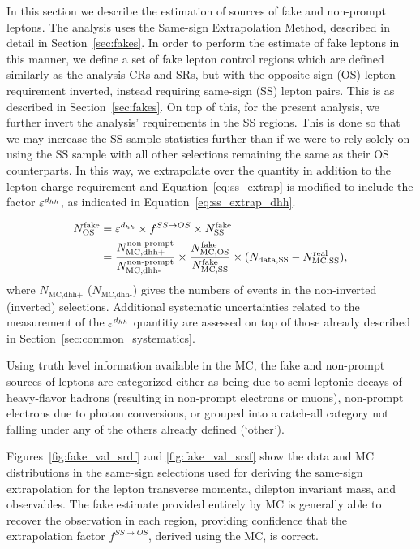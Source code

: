 In this section we describe the estimation of sources of fake and non-prompt leptons.
The analysis uses the Same-sign Extrapolation Method, described in detail in Section~\ref{sec:fakes}.
In order to perform the estimate of fake leptons in this manner, we define a set of fake lepton control
regions which are defined similarly as the analysis CRs and SRs, but with the opposite-sign (OS)
lepton requirement inverted, instead requiring same-sign (SS) lepton pairs.
This is as described in Section~\ref{sec:fakes}.
On top of this, for the present analysis, we further invert the analysis' \dhh requirements in the SS
regions.
This is done so that we may increase the SS sample statistics further than if we were to rely solely
on using the SS sample with all other selections remaining the same as their OS counterparts.
In this way, we extrapolate over the \dhh quantity in addition to the lepton charge requirement
and Equation~\ref{eq:ss_extrap} is modified to include the factor $\varepsilon^{ d_{hh}}$, as indicated in Equation~\ref{eq:ss_extrap_dhh}.

\begin{align}
    N_{\text{OS}}^{\text{fake}} &= \varepsilon^{ d_{hh}} \times f^{SS \rightarrow OS} \times N_{\text{SS}}^{\text{fake}} \nonumber \\
        &= \frac{N_{\text{MC,dhh+}}^{\text{non-prompt}}}{N_{\text{MC,dhh-}}^{\text{non-prompt}}} \times  \frac{ N_{\text{MC,OS}}^{\text{fake}} }{ N_{\text{MC,SS}}^{\text{fake}} } \times ( N_{\text{data,SS}} - N_{\text{MC,SS}}^{\text{real}} ),
        \label{eq:ss_extrap_dhh}
\end{align}
where $N_{\text{MC,dhh+}}$ ($N_{\text{MC,dhh-}}$) gives the numbers of events in the non-inverted (inverted)
\dhh selections.
Additional systematic uncertainties related to the measurement of the $\varepsilon^{ d_{hh}}$ quantitiy are
assessed on top of those already described in Section~\ref{sec:common_systematics}.

Using truth level information available in the MC, the fake and non-prompt sources of leptons are
categorized either as being due to semi-leptonic decays of heavy-flavor hadrons (resulting in non-prompt electrons
or muons), non-prompt electrons due to photon conversions, or grouped into a catch-all category not
falling under any of the others already defined (`other').

Figures~\ref{fig:fake_val_srdf} and \ref{fig:fake_val_srsf} show the data and MC distributions in the same-sign
selections used for deriving the same-sign extrapolation for the lepton transverse momenta, dilepton invariant
mass, and \dhh observables.
The fake estimate provided entirely by MC is generally able to recover the observation in each region, providing
confidence that the extrapolation factor $f^{SS \rightarrow OS}$, derived using the MC, is correct.


